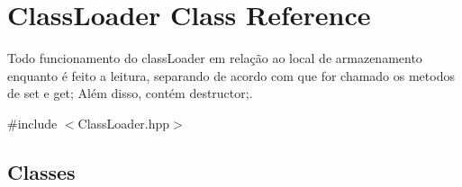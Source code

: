 \hypertarget{class_class_loader}{}\section{Class\+Loader Class Reference}
\label{class_class_loader}


Todo funcionamento do class\+Loader em relação ao local de armazenamento enquanto é feito a leitura, separando de acordo com que for chamado os metodos de set e get; Além disso, contém destructor;.  




{\ttfamily \#include $<$Class\+Loader.\+hpp$>$}

\subsection*{Classes}
